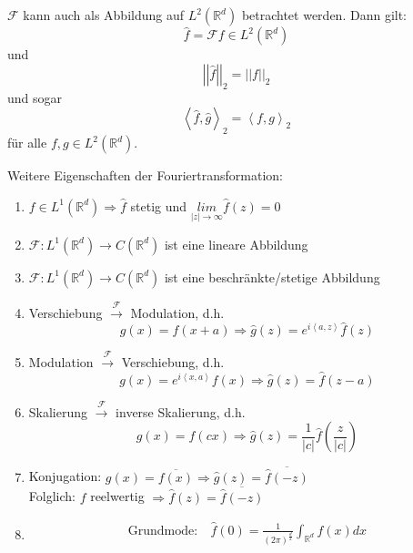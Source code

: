 \documentclass[ngerman]{article}
\theoremstyle{plain}
\theoremstyle{definition}
\numberwithin{equation}{section}
\newcommand{\norm}[1] {
\left|\left| #1 \right|\right|
}
\newcommand{\skprod}[2]{
\left \langle #1,#2 \right \rangle
}
\newcommand{\abs}[1] {
\left| #1 \right|
}
\newcommand{\R}[0] {
\mathbb R
}
\begin{document}
    $\mathcal F$ kann auch als Abbildung auf $L^2(\R^d)$ betrachtet werden. Dann gilt:\\
    \[\hat f = \mathcal F f \in L^2(\R^d)\]
    und
    \begin{equation}
        \norm{\hat f}_2 = \norm{f}_2
    \end{equation}
    und sogar
    \begin{equation}
        \skprod{\hat f}{\hat g}_2 = \skprod{f}{g}_2
    \end{equation}
    für alle $f,g \in L^2(\R^d)$.

    Weitere Eigenschaften der Fouriertransformation:

    \begin{enumerate}[label = \roman *)]
        \item $f \in L^1(\R^d) \Rightarrow \hat f$ stetig und $\underset{\abs{z} \to \infty}{lim} \hat f(z) = 0$
        \item $\mathcal F: L^1(\R^d) \to C(\R^d)$ ist eine lineare Abbildung
        \item $\mathcal F: L^1(\R^d) \to C(\R^d)$ ist eine beschränkte/stetige Abbildung
        \item Verschiebung $\overset{\mathcal F}{\to}$ Modulation, d.h.
        \begin{equation*}
            g(x) = f(x+a) \Rightarrow \hat g(z) = e^{i \skprod{a}{z}} \hat f(z)
        \end{equation*}
        \item Modulation $\overset{\mathcal F}{\to}$ Verschiebung, d.h.
        \begin{equation*}
            g(x) = e^{i \skprod{x}{a}} f(x) \Rightarrow \hat g(z)= \hat f(z-a)
        \end{equation*}
        \item Skalierung $\overset{\mathcal F}{\to}$ inverse Skalierung, d.h.
        \begin{equation*}
            g(x)=f(cx) \Rightarrow \hat g(z) = \frac{1}{\abs c} \hat f(\frac{z}{\abs c})
        \end{equation*}
        \item Konjugation: $g(x) = \overline{f(x)} \Rightarrow \hat g(z) = \overline{\hat f (-z)}$\\
        Folglich: $f$ reelwertig $\Rightarrow \hat f(z) = \overline{\hat f(-z)}$
        \item
        \begin{align*}
            \text{Grundmode:} \ & \displaystyle \hat f(0) = \frac{1}{(2 \pi )^\frac{d}{2}} \int_{\R^d} f(x) dx\\

\end{align*}
\end{enumerate}
\end{document}
